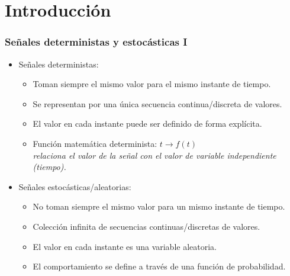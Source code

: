 

\section{Introducción}


\begin{frame}\frametitle{Señales deterministas y estocásticas I}
    \footnotesize
    \begin{itemize}
        \item \alert{Señales deterministas}: 
        \begin{itemize}\footnotesize
            \item Toman siempre el mismo valor para el mismo instante de tiempo. 
            \item Se representan por una única secuencia continua/discreta de valores. 
            \item El valor en cada instante puede ser definido de forma explícita.
            \item Función matemática determinista:  $t \rightarrow f(t)$\\\scriptsize\color{gray} \emph{relaciona el valor de la señal con el valor de variable independiente (tiempo).}
        \end{itemize}
        \item \alert{Señales estocásticas/aleatorias}: 
        \begin{itemize}\footnotesize
            \item No toman siempre el mismo valor para un mismo instante de tiempo. 
            \item Colección infinita de secuencias continuas/discretas de valores. 
            \item El valor en cada instante es una variable aleatoria.
            \item El comportamiento se define a través de una función de probabilidad.
        \end{itemize}
    \end{itemize}
\end{frame}


